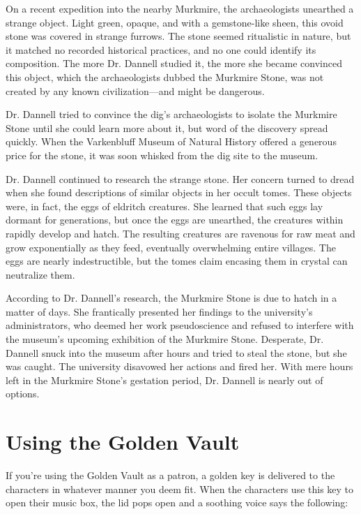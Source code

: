 \documentclass[10pt,a4paper,twoside,bg=print,twocolumn,openany,nodeprecatedcode]{dndbook}
\begin{document}
On a recent expedition into the nearby Murkmire, the archaeologists unearthed a strange object. Light green, opaque, and with a gemstone-like sheen, this ovoid stone was covered in strange furrows. The stone seemed ritualistic in nature, but it matched no recorded historical practices, and no one could identify its composition. The more Dr. Dannell studied it, the more she became convinced this object, which the archaeologists dubbed the Murkmire Stone, was not created by any known civilization—and might be dangerous.

Dr. Dannell tried to convince the dig's archaeologists to isolate the Murkmire Stone until she could learn more about it, but word of the discovery spread quickly. When the Varkenbluff Museum of Natural History offered a generous price for the stone, it was soon whisked from the dig site to the museum.

Dr. Dannell continued to research the strange stone. Her concern turned to dread when she found descriptions of similar objects in her occult tomes. These objects were, in fact, the eggs of eldritch creatures. She learned that such eggs lay dormant for generations, but once the eggs are unearthed, the creatures within rapidly develop and hatch. The resulting creatures are ravenous for raw meat and grow exponentially as they feed, eventually overwhelming entire villages. The eggs are nearly indestructible, but the tomes claim encasing them in crystal can neutralize them.

According to Dr. Dannell's research, the Murkmire Stone is due to hatch in a matter of days. She frantically presented her findings to the university's administrators, who deemed her work pseudoscience and refused to interfere with the museum's upcoming exhibition of the Murkmire Stone. Desperate, Dr. Dannell snuck into the museum after hours and tried to steal the stone, but she was caught. The university disavowed her actions and fired her. With mere hours left in the Murkmire Stone's gestation period, Dr. Dannell is nearly out of options.

\section{Using the Golden Vault}
If you're using the Golden Vault as a patron, a golden key is delivered to the characters in whatever manner you deem fit. When the characters use this key to open their music box, the lid pops open and a soothing voice says the following:
\end{document}
